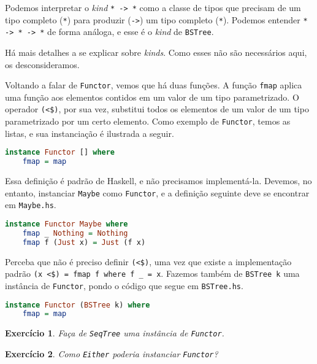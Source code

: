 \documentclass[a4paper]{article}
\newtheorem{exercicio}{Exercício}
\begin{document}
Podemos interpretar o \emph{kind} \texttt{* -> *} como a classe de tipos que precisam de um tipo completo (\texttt{*}) para produzir (\texttt{->}) um tipo completo (\texttt{*}).
Podemos entender \texttt{* -> * -> *} de forma análoga, e esse é o \emph{kind} de \texttt{BSTree}.

Há mais detalhes a se explicar sobre \emph{kinds}.
Como esses não são necessários aqui, os desconsideramos.

Voltando a falar de \texttt{Functor}, vemos que há duas funções.
A função \texttt{fmap} aplica uma função aos elementos contidos em um valor de um tipo parametrizado.
O operador \texttt{(<\$)}, por sua vez, substitui todos os elementos de um valor de um tipo parametrizado por um certo elemento.
Como exemplo de \texttt{Functor}, temos as listas, e sua instanciação é ilustrada a seguir.

\begin{lstlisting}[language=haskell, frame=single]
instance Functor [] where
	fmap = map
\end{lstlisting}

Essa definição é padrão de Haskell, e não precisamos implementá-la.
Devemos, no entanto, instanciar \texttt{Maybe} como \texttt{Functor}, e a definição seguinte deve se encontrar em \texttt{Maybe.hs}.

\begin{lstlisting}[language=haskell, frame=single]
instance Functor Maybe where
	fmap _ Nothing = Nothing
	fmap f (Just x) = Just (f x)
\end{lstlisting}

Perceba que não é preciso definir \texttt{(<\$)}, uma vez que existe a implementação padrão \mbox{\texttt{(x <\$) = fmap f where f \_ = x}}.
Fazemos também de \texttt{BSTree k} uma instância de \texttt{Functor}, pondo o código que segue em \texttt{BSTree.hs}.

\begin{lstlisting}[language=haskell, frame=single]
instance Functor (BSTree k) where
	fmap = map
\end{lstlisting}

\begin{exercicio}
	Faça de \emph{\texttt{SeqTree}} uma instância de \emph{\texttt{Functor}}.
\end{exercicio}

\begin{exercicio}
	Como \emph{\texttt{Either}} poderia instanciar \emph{\texttt{Functor}}?
\end{exercicio}
\end{document}
